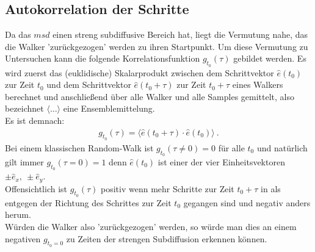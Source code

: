 \documentclass[a4paper, 12pt]{scrartcl}
\begin{document}
\subsection{Autokorrelation der Schritte}
Da das $msd$ einen streng subdiffusive Bereich hat, liegt die Vermutung nahe, das die Walker 'zurückgezogen' werden zu ihren Startpunkt. Um diese Vermutung zu Untersuchen kann die folgende Korrelationsfunktion $g_{t_0}(\tau)$ gebildet werden. Es wird zuerst das (euklidische) Skalarprodukt zwischen dem Schrittvektor $\hat{e}(t_0)$ zur Zeit $t_0$ und dem Schrittvektor \break $\hat{e}(t_0+\tau)$ zur Zeit $t_0 + \tau$ eines Walkers berechnet und anschließend über alle Walker und alle Samples gemittelt, also bezeichnet $\langle \dots \rangle$ eine Ensemblemittelung. \\
\noindent Es ist demnach:
\begin{align}
g_{t_0}(\tau) = \langle \hat{e}(t_0+\tau) \cdot \hat{e}(t_0) \rangle\ .
\end{align}
Bei einem klassischen Random-Walk ist $g_{t_0}(\tau \neq 0)= 0$ für alle $t_0$ und natürlich gilt immer $g_{t_0}(\tau = 0)= 1$ denn $\hat{e}(t_0)$ ist einer der vier Einheitsvektoren $\pm \hat{e}_x,\ \pm \hat{e}_y$.
\\
Offensichtlich ist $g_{t_0}(\tau)$ positiv wenn mehr Schritte zur Zeit $t_0+\tau$ in als entgegen der Richtung des Schrittes zur Zeit $t_0$ gegangen sind und negativ anders herum. 
\\
\noindent Würden die Walker also 'zurückgezogen' werden, so würde man dies an einem negativen $g_{t_0=0}$ zu Zeiten der strengen Subdiffusion erkennen können. 
\end{document}
